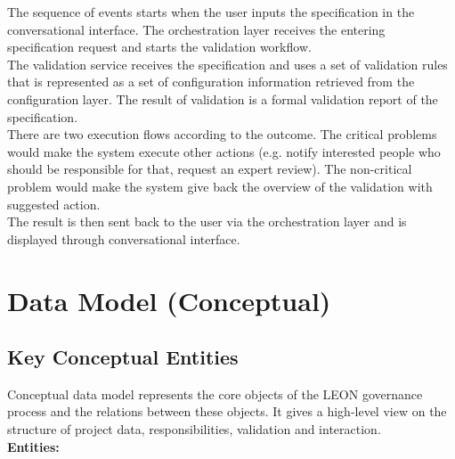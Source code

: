 The sequence of events starts when the user inputs the specification in the conversational interface. The orchestration layer receives the entering specification request and starts the validation workflow.\\
The validation service receives the specification and uses a set of validation rules that is represented as a set of configuration information retrieved from the configuration layer. The result of validation is a formal validation report of the specification.\\
There are two execution flows according to the outcome. The critical problems would make the system execute other actions (e.g. notify interested people who should be responsible for that, request an expert review). The non-critical problem would make the system give back the overview of the validation with suggested action.\\
The result is then sent back to the user via the orchestration layer and is displayed through conversational interface.

\section{\textcolor[HTML]{0066CC}{Data Model (Conceptual)}}
\label{sec:design-data-model}

\subsection*{\textcolor[HTML]{003D99}{Key Conceptual Entities}}

Conceptual data model represents the core objects of the LEON governance process and the relations between these objects. It gives a high-level view on the structure of project data, responsibilities, validation and interaction.\\
\vspace{0.2cm}
\noindent\textcolor[HTML]{0066CC}{\textbf{Entities:}}

